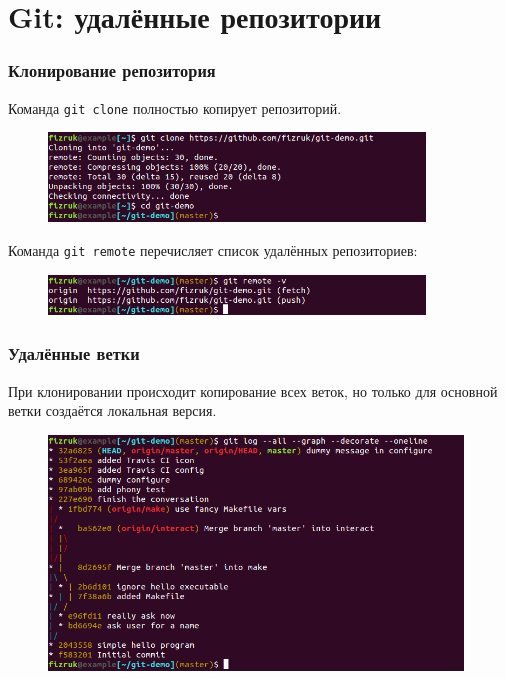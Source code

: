\documentclass{beamer}
\begin{document}
\section{Git: удалённые репозитории}

\begin{frame}
  \frametitle{Клонирование репозитория}
  Команда \texttt{git clone} полностью копирует репозиторий.

  \begin{figure}
    \includegraphics[width=10cm]{images/git-clone.png}
  \end{figure}

  Команда \texttt{git remote} перечисляет список удалённых репозиториев:

  \begin{figure}
    \includegraphics[width=10cm]{images/git-remote.png}
  \end{figure}
\end{frame}

\begin{frame}
  \frametitle{Удалённые ветки}
  При клонировании происходит копирование всех веток, но только для основной
  ветки создаётся локальная версия.

  \begin{figure}
    \includegraphics[width=11cm]{images/git-log-graph.png}
  \end{figure}
\end{frame}
\end{document}
